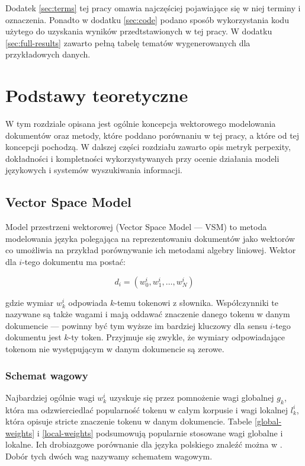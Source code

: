 \documentclass[11pt,a4paper]{article}
\begin{document}
Dodatek \ref{sec:terms} tej pracy omawia najczęściej pojawiające się w niej
terminy i oznaczenia.  Ponadto w dodatku \ref{sec:code} podano sposób
wykorzystania kodu użytego do uzyskania wyników przedtstawionych w tej pracy. W
dodatku \ref{sec:full-results} zawarto pełną tabelę tematów wygenerowanych
dla przykładowych danych.

\pagebreak


\section{Podstawy teoretyczne}
\label{sec:theory}

W tym rozdziale opisana jest ogólnie koncepcja wektorowego modelowania
dokumentów oraz metody, które poddano porównaniu w tej pracy, a które od tej
koncepcji pochodzą. W dalszej części rozdziału zawarto opis metryk perpexity,
dokładności i kompletności wykorzystywanych przy ocenie działania modeli
językowych i systemów wyszukiwania informacji.

\subsection{Vector Space Model}

Model przestrzeni wektorowej (Vector Space Model --- VSM) to metoda modelowania
języka polegająca na reprezentowaniu dokumentów jako wektorów co umożliwia na
przykład porównywanie ich metodami algebry liniowej.  Wektor dla $i$-tego
dokumentu ma postać:

\begin{equation}
d_i = (w^i_0, w^i_1, \ldots, w^i_N)
\end{equation}

gdzie wymiar $w^i_k$ odpowiada $k$-temu tokenowi z słownika. Współczynniki te
nazywane są także wagami i mają oddawać znaczenie danego tokenu w danym
dokumencie --- powinny być tym wyższe im bardziej kluczowy dla sensu $i$-tego
dokumentu jest $k$-ty token. Przyjmuje się zwykle, że wymiary odpowiadające
tokenom nie występującym w danym dokumencie są zerowe.

\subsubsection{Schemat wagowy}
\label{weighting-theory}
Najbardziej ogólnie wagi $w^i_k$ uzyskuje się przez pomnożenie wagi globalnej
$g_k$, która ma odzwierciedlać popularność tokenu w całym korpusie i wagi
lokalnej $l^i_k$, która opisuje stricte znaczenie tokenu w danym dokumencie.
Tabele \ref{global-weights} i \ref{local-weights} podsumowują popularnie
stosowane wagi globalne i lokalne. Ich drobiazgowe porównanie dla języka
polskiego znaleźć można w \cite{figiel}. Dobór tych dwóch wag nazywamy
schematem wagowym.
\end{document}
